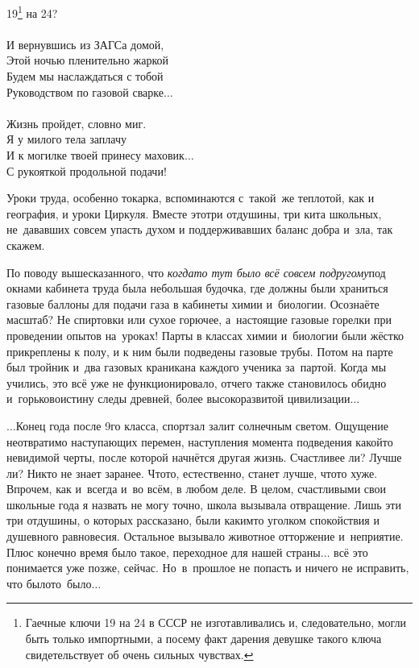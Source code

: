 {\hspace*{2.7cm}19\footnote{Гаечные ключи 19 на 24 в СССР не изготавливались и, следовательно, могли быть только импортными, а посему факт дарения девушке такого ключа свидетельствует об очень сильных чувствах.} на 24?\\
\\
\hspace*{2.7cm}И вернувшись из ЗАГСа домой,\\
\hspace*{2.7cm}Этой ночью пленительно жаркой\\
\hspace*{2.7cm}Будем мы наслаждаться с тобой\\
\hspace*{2.7cm}Руководством по газовой сварке$\ldots$\\
\\
\hspace*{2.7cm}Жизнь пройдет, словно миг.\\
\hspace*{2.7cm}Я у милого тела заплачу\\
\hspace*{2.7cm}И к могилке твоей принесу маховик$\ldots$\\
\hspace*{2.7cm}С рукояткой продольной подачи!\\ 
}
\vspace{0.1cm}

Уроки труда, особенно токарка, вспоминаются с~такой~же теплотой, как и география, и уроки Циркуля. Вместе это\mdash три отдушины, три кита школьных, не~дававших совсем упасть духом и поддерживавших баланс добра и~зла, так скажем. 

По поводу вышесказанного, что \textit{когда\sdash то тут было всё совсем по\sdash другому}\mdash под окнами кабинета труда была небольшая будочка, где должны были храниться газовые баллоны для подачи газа в кабинеты химии и~биологии. Осознаёте масштаб? Не спиртовки или сухое горючее, а~настоящие газовые горелки при проведении опытов на~уроках! Парты в классах химии и~биологии были жёстко прикреплены к полу, и к ним были подведены газовые трубы. Потом на парте был тройник и~два газовых краника\mdash на каждого ученика за~партой. Когда мы учились, это всё уже не функционировало, отчего также становилось обидно и~горько\mdash воистину следы древней, более высокоразвитой цивилизации$\ldots$

$\ldots$Конец года после 9\sdash го класса, спортзал залит солнечным светом. Ощущение неотвратимо наступающих перемен, наступления момента подведения какой\sdash то невидимой черты, после которой начнётся другая жизнь. Счастливее ли? Лучше ли? Никто не знает заранее. Что\sdash то, естественно, станет лучше, что\sdash то хуже. Впрочем, как и~всегда и~во всём, в любом деле. В целом, счастливыми свои школьные года я назвать не могу точно, школа вызывала отвращение. Лишь эти три отдушины, о которых рассказано, были каким\sdash то уголком спокойствия и душевного равновесия. Остальное вызывало животное отторжение и~неприятие. Плюс конечно время было такое, переходное для нашей страны$\ldots$ всё это понимается уже позже, сейчас. Но~в~прошлое не попасть и ничего не исправить, что было\mdash то~было$\ldots$  

\begin{center}
\end{center}